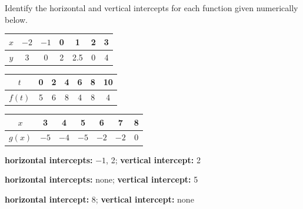 \begin{exercise}
Identify the horizontal and vertical intercepts for each function given numerically below.


\begin{parts}
\item \begin{tabular}{|c|c|c|c|c|c|c|}
\hline $x$ &$-2$ & $-1$ & 0 & 1 & 2 & 3
\\\hline $y$ & 3 & 0  & 2 & 2.5  & 0 & 4 
\\\hline
\end{tabular}

\vspace{5pt}

\item \begin{tabular}{|c|c|c|c|c|c|c|}
\hline $t$ &0 & 2 & 4 & 6 & 8 & 10
\\\hline $f(t)$ & 5 & 6  & 8 & 4  & 8 & 4 
\\\hline
\end{tabular}

\vspace{5pt}

\item\begin{tabular}{|c|c|c|c|c|c|c|}
\hline $x$ &3 & 4 & 5 & 6 & 7 & 8
\\\hline $g(x)$ & $-5$ & $-4$  & $-5$ & $-2$  & $-2$ & 0 
\\\hline
\end{tabular}

\end{parts}
\end{exercise}



\begin{solution}
    \begin{parts}
        \item {\bf horizontal intercepts:} $-1$, 2; {\bf vertical intercept:} 2
        \item {\bf horizontal intercepts:} none; {\bf vertical intercept:} 5
        \item {\bf horizontal intercept:} 8; {\bf vertical intercept:} none
    \end{parts}
\end{solution}





